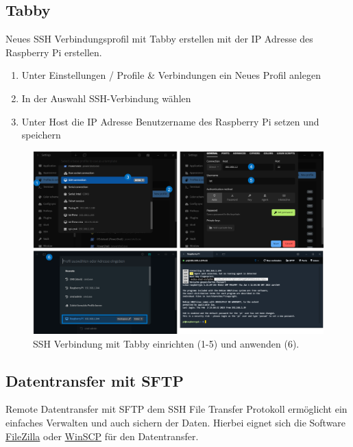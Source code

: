 \documentclass[
  11pt,
  a4paper,
  oneside, openany  ,captions=tableheading
]{scrbook}
\providecommand{\tightlist}{%
  \setlength{\itemsep}{0pt}\setlength{\parskip}{0pt}}
\theoremstyle{remark}
\begin{document}
\subsection{\texorpdfstring{Tabby}{Tabby}}\label{tabby}

Neues SSH Verbindungsprofil mit Tabby erstellen mit der IP Adresse des
Raspberry Pi erstellen.

\begin{enumerate}
\def\labelenumi{\arabic{enumi}.}
\tightlist
\item
  Unter Einstellungen / Profile \& Verbindungen ein Neues Profil anlegen
\item
  In der Auswahl SSH-Verbindung wählen
\item
  Unter Host die IP Adresse Benutzername des Raspberry Pi setzen und
  speichern
\end{enumerate}

\begin{figure}[H]

{\centering \includegraphics{images/raspberry_pi_tabby.png}

}

\caption{SSH Verbindung mit Tabby einrichten (1-5) und anwenden (6).}

\end{figure}%

\subsection{Datentransfer mit SFTP}\label{datentransfer-mit-sftp}

Remote Datentransfer mit SFTP dem SSH File Transfer
Protokoll ermöglicht ein
einfaches Verwalten und auch sichern der Daten. Hierbei eignet sich die
Software \href{https://filezilla-project.org/}{FileZilla} oder
\href{https://winscp.net/eng/docs/lang:de}{WinSCP} für den
Datentransfer.
\end{document}

